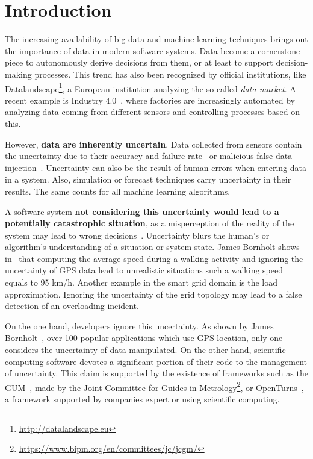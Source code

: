 \section{Introduction}

The increasing availability of big data and machine learning techniques brings out the importance of data in modern software systems.
Data become a cornerstone piece to autonomously derive decisions from them, or at least to support decision-making processes.
This trend has also been recognized by official institutions, like Datalandscape\footnote{\url{http://datalandscape.eu}}, a European institution analyzing the so-called \textit{data market}.
A recent example is Industry 4.0~\cite{DBLP:journals/bise/LasiFKFH14}, where factories are increasingly automated by analyzing data coming from different sensors and controlling processes based on this.

However, \textbf{data are inherently uncertain}. 
Data collected from sensors contain the uncertainty due to their accuracy and failure rate~\cite{DBLP:conf/asplos/BornholtMM14, metrology2008evaluation} or malicious false data injection~\cite{liang20172015}.
Uncertainty can also be the result of human errors when entering data in a system.
Also, simulation or forecast techniques carry uncertainty in their results.
The same counts for all machine learning algorithms.

A software system \textbf{not considering this uncertainty would lead to a potentially catastrophic situation}, as a misperception of the reality of the system may lead to wrong decisions~\cite{DBLP:conf/asplos/BornholtMM14}.
Uncertainty blurs the human's or algorithm's understanding of a situation or system state.
James Bornholt shows in~\cite{bornholt2013abstractions} that computing the average speed during a walking activity and ignoring the uncertainty of GPS data lead to unrealistic situations such a walking speed equals to 95 km/h.
Another example in the smart grid domain is the load approximation.
Ignoring the uncertainty of the grid topology may lead to a false detection of an overloading incident.

On the one hand, developers ignore this uncertainty.
As shown by James Bornholt~\cite{bornholt2013abstractions}, over 100 popular applications which use GPS location, only one considers the uncertainty of data manipulated.
On the other hand, scientific computing software devotes a significant portion of their code to the management of uncertainty.
This claim is supported by the existence of frameworks such as the GUM~\cite{metrology2008evaluation}, made by the Joint Committee for Guides in Metrology\footnote{\url{https://www.bipm.org/en/committees/jc/jcgm/}}, or OpenTurns~\cite{baudin2017openturns}, a framework supported by companies expert or using scientific computing.

